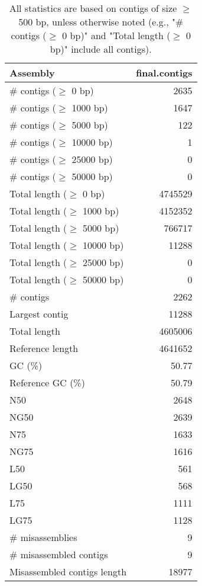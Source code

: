 \documentclass[12pt,a4paper]{article}
\begin{document}
\begin{table}[ht]
\begin{center}
\caption{All statistics are based on contigs of size $\geq$ 500 bp, unless otherwise noted (e.g., "\# contigs ($\geq$ 0 bp)" and "Total length ($\geq$ 0 bp)" include all contigs).}
\begin{tabular}{|l*{1}{|r}|}
\hline
Assembly & final.contigs \\ \hline
\# contigs ($\geq$ 0 bp) & 2635 \\ \hline
\# contigs ($\geq$ 1000 bp) & 1647 \\ \hline
\# contigs ($\geq$ 5000 bp) & 122 \\ \hline
\# contigs ($\geq$ 10000 bp) & 1 \\ \hline
\# contigs ($\geq$ 25000 bp) & 0 \\ \hline
\# contigs ($\geq$ 50000 bp) & 0 \\ \hline
Total length ($\geq$ 0 bp) & 4745529 \\ \hline
Total length ($\geq$ 1000 bp) & 4152352 \\ \hline
Total length ($\geq$ 5000 bp) & 766717 \\ \hline
Total length ($\geq$ 10000 bp) & 11288 \\ \hline
Total length ($\geq$ 25000 bp) & 0 \\ \hline
Total length ($\geq$ 50000 bp) & 0 \\ \hline
\# contigs & 2262 \\ \hline
Largest contig & 11288 \\ \hline
Total length & 4605006 \\ \hline
Reference length & 4641652 \\ \hline
GC (\%) & 50.77 \\ \hline
Reference GC (\%) & 50.79 \\ \hline
N50 & 2648 \\ \hline
NG50 & 2639 \\ \hline
N75 & 1633 \\ \hline
NG75 & 1616 \\ \hline
L50 & 561 \\ \hline
LG50 & 568 \\ \hline
L75 & 1111 \\ \hline
LG75 & 1128 \\ \hline
\# misassemblies & 9 \\ \hline
\# misassembled contigs & 9 \\ \hline
Misassembled contigs length & 18977 \\ \hline

\end{tabular}
\end{center}
\end{table}
\end{document}
